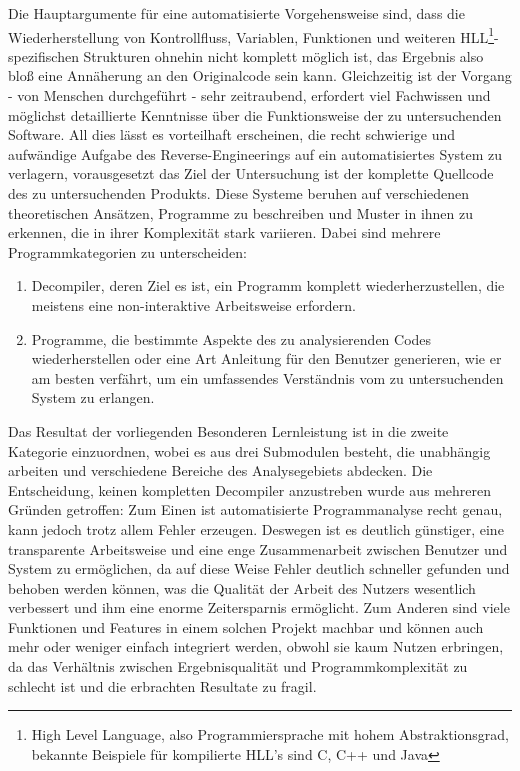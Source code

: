 \documentclass[11pt]{article}
\begin{document}
Die Hauptargumente für eine automatisierte Vorgehensweise sind, dass die Wiederherstellung von Kontrollfluss,
Variablen, Funktionen und weiteren HLL\footnote{High Level Language, also Programmiersprache mit hohem
Abstraktionsgrad, bekannte Beispiele für kompilierte HLL's sind C, C++ und Java}-spezifischen Strukturen
ohnehin nicht komplett möglich ist, das Ergebnis also bloß eine Annäherung an den Originalcode sein kann.
Gleichzeitig ist der Vorgang - von Menschen durchgeführt - sehr zeitraubend, erfordert viel
Fachwissen und möglichst detaillierte Kenntnisse über die Funktionsweise der zu untersuchenden Software.
All dies lässt es vorteilhaft erscheinen, die recht schwierige und aufwändige  Aufgabe des
Reverse-Engineerings auf ein automatisiertes System zu verlagern, vorausgesetzt das Ziel der Untersuchung
ist der komplette Quellcode des zu untersuchenden Produkts. Diese Systeme beruhen auf verschiedenen
theoretischen Ansätzen, Programme zu beschreiben und Muster in ihnen zu erkennen, die in ihrer Komplexität
stark variieren. Dabei sind mehrere Programmkategorien zu unterscheiden:
\begin{enumerate}
	\item{Decompiler, deren Ziel es ist, ein Programm
		komplett wiederherzustellen, die meistens eine non-interaktive Arbeitsweise erfordern.}
	\item{Programme, die bestimmte Aspekte des zu analysierenden Codes wiederherstellen oder eine Art
		Anleitung für den Benutzer generieren, wie er am besten verfährt, um ein umfassendes Verständnis
		vom zu untersuchenden System zu erlangen.}
\end{enumerate}

Das Resultat der vorliegenden Besonderen Lernleistung ist in
die zweite Kategorie einzuordnen, wobei es aus drei Submodulen besteht, die unabhängig arbeiten und
verschiedene Bereiche des Analysegebiets abdecken. Die Entscheidung, keinen kompletten Decompiler
anzustreben wurde aus mehreren Gründen getroffen: Zum Einen ist automatisierte Programmanalyse recht
genau, kann jedoch trotz allem Fehler erzeugen. Deswegen ist es deutlich günstiger, eine
transparente Arbeitsweise und eine enge Zusammenarbeit zwischen Benutzer und System zu ermöglichen,
da auf diese Weise Fehler deutlich schneller gefunden und behoben werden können, was die Qualität
der Arbeit des Nutzers wesentlich verbessert und ihm eine enorme Zeitersparnis ermöglicht. Zum Anderen sind
viele Funktionen und Features in einem solchen Projekt machbar und können auch mehr oder weniger
einfach integriert werden, obwohl sie kaum Nutzen erbringen, da das Verhältnis zwischen
Ergebnisqualität und Programmkomplexität zu schlecht ist und die erbrachten Resultate zu fragil.
\end{document}

